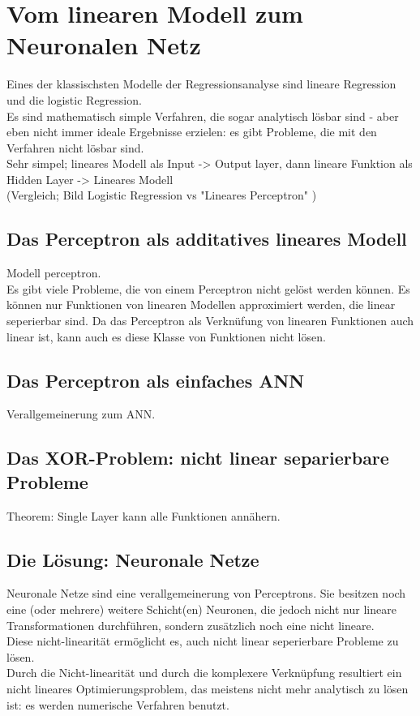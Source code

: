 ﻿\section{Vom linearen Modell zum Neuronalen Netz}
Eines der klassischsten Modelle der Regressionsanalyse sind lineare Regression und die logistic Regression. \\

Es sind mathematisch simple Verfahren, die sogar analytisch lösbar sind - aber eben nicht immer ideale Ergebnisse erzielen: es gibt Probleme, die mit den Verfahren nicht lösbar sind. 
\\


Sehr simpel; lineares Modell als Input -> Output layer,
dann lineare Funktion als Hidden Layer -> Lineares Modell \\
(Vergleich; Bild Logistic Regression vs "Lineares Perceptron" )

\subsection{Das Perceptron als additatives lineares Modell}

Modell perceptron. \\

Es gibt viele Probleme, die von einem Perceptron nicht gelöst werden können. Es können nur Funktionen von linearen Modellen approximiert werden, die linear seperierbar sind. Da das Perceptron als Verknüfung von linearen Funktionen auch linear ist, kann auch es diese Klasse von Funktionen nicht lösen.

\subsection{Das Perceptron als einfaches ANN}

Verallgemeinerung zum ANN. \\

\subsection{Das XOR-Problem: nicht linear separierbare Probleme}
Theorem: Single Layer kann alle Funktionen annähern.

\subsection{Die Lösung: Neuronale Netze}
Neuronale Netze sind eine verallgemeinerung von Perceptrons. Sie besitzen noch eine (oder mehrere) weitere Schicht(en) Neuronen, die jedoch nicht nur lineare Transformationen durchführen, sondern zusätzlich noch eine nicht lineare. \\

Diese nicht-linearität ermöglicht es, auch nicht linear seperierbare Probleme zu lösen.\\

Durch die Nicht-linearität und durch die komplexere Verknüpfung resultiert ein nicht lineares Optimierungsproblem, das meistens nicht mehr analytisch zu lösen ist: es werden numerische Verfahren benutzt.


